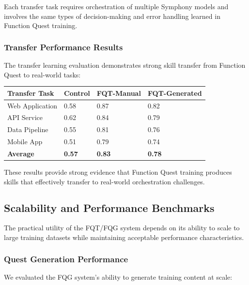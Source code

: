 Each transfer task requires orchestration of multiple Symphony models and involves the same types of decision-making and error handling learned in Function Quest training.

\subsubsection*{Transfer Performance Results}

The transfer learning evaluation demonstrates strong skill transfer from Function Quest to real-world tasks:

\begin{center}
\begin{tabular}{@{}llll@{}}
\toprule
\textbf{Transfer Task} & \textbf{Control} & \textbf{FQT-Manual} & \textbf{FQT-Generated} \\
\midrule
Web Application & 0.58 & 0.87 & 0.82 \\
API Service & 0.62 & 0.84 & 0.79 \\
Data Pipeline & 0.55 & 0.81 & 0.76 \\
Mobile App & 0.51 & 0.79 & 0.74 \\
\textbf{Average} & \textbf{0.57} & \textbf{0.83} & \textbf{0.78} \\
\bottomrule
\end{tabular}
\end{center}

These results provide strong evidence that Function Quest training produces skills that effectively transfer to real-world orchestration challenges.

\subsection*{Scalability and Performance Benchmarks}

The practical utility of the FQT/FQG system depends on its ability to scale to large training datasets while maintaining acceptable performance characteristics.

\subsubsection*{Quest Generation Performance}

We evaluated the FQG system's ability to generate training content at scale:

